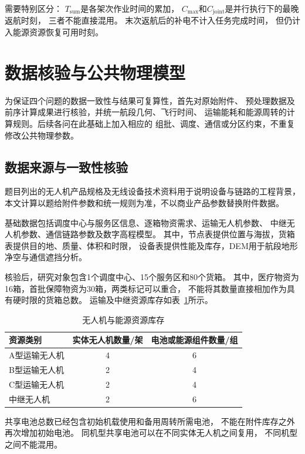 \documentclass[bwprint]{gmcmthesis}
\begin{document}
需要特别区分：
$T_{\mathrm{sum}}$是各架次作业时间的累加，
$C_{\max}$和$C_{\mathrm{joint}}$是并行执行下的最晚返航时刻，
三者不能直接混用。
末次返航后的补电不计入任务完成时间，
但仍计入能源资源恢复可用时刻。



\section{数据核验与公共物理模型}

为保证四个问题的数据一致性与结果可复算性，首先对原始附件、
预处理数据及前序计算成果进行核验，并统一航段几何、飞行时间、
运输能耗和能源周转的计算规则。后续各问在此基础上加入相应的
组批、调度、通信或分区约束，不重复修改公共物理参数。

\subsection{数据来源与一致性核验}
题目列出的无人机产品规格及无线设备技术资料\cite{dji350,doodle}用于说明设备与链路的工程背景，本文计算以题给附件参数和统一规则为准，不以商业产品参数替换附件数据。


基础数据包括调度中心与服务区信息、逐箱物资需求、运输无人机参数、
中继无人机参数、通信链路参数及数字高程模型。
其中，节点表提供位置与海拔，货箱表提供目的地、质量、体积和时限，
设备表提供性能及库存，DEM用于航段地形净空与通信遮挡分析。

核验后，研究对象包含1个调度中心、15个服务区和80个货箱。
其中，医疗物资为16箱，首批保障物资为30箱，两类标记可以重合，
不能将其数量直接相加作为具有硬时限的货箱总数。
运输及中继资源库存如表~\ref{tab:resource_inventory}所示。

\begin{table}[htbp]
    \centering
    \caption{无人机与能源资源库存}
    \label{tab:resource_inventory}
    \begin{tabular}{lcc}
        \toprule
        资源类别 & 实体无人机数量/架 & 电池或能源组件数量/组 \\
        \midrule
        A型运输无人机 & 4 & 6 \\
        B型运输无人机 & 2 & 4 \\
        C型运输无人机 & 2 & 4 \\
        中继无人机   & 2 & 6 \\
        \bottomrule
    \end{tabular}
\end{table}

共享电池总数已经包含初始机载使用和备用周转所需电池，
不能在附件库存之外再次增加初始电池。
同机型共享电池可以在不同实体无人机之间复用，
不同机型之间不能混用。
\end{document}
